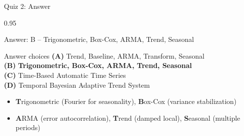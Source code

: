 \documentclass[9pt, aspectratio=169, t]{beamer}
\begin{document}
\begin{frame}{Quiz 2: Answer}
    \begin{cminipage}{0.95\textwidth}
    \begin{exampleblock}{Answer: B -- Trigonometric, Box-Cox, ARMA, Trend, Seasonal}

    \begin{block}{Answer choices}
        \textcolor{MainBlue}{\textbf{(A)}} Trend, Baseline, ARMA, Transform, Seasonal \incorrect\\[3pt]
        \textcolor{MainBlue}{\textbf{(B)}} \textbf{\textcolor{Forest}{Trigonometric, Box-Cox, ARMA, Trend, Seasonal}} \correct\\[3pt]
        \textcolor{MainBlue}{\textbf{(C)}} Time-Based Automatic Time Series \incorrect\\[3pt]
        \textcolor{MainBlue}{\textbf{(D)}} Temporal Bayesian Adaptive Trend System \incorrect
    \end{block}

        \vspace{0.3cm}

        \begin{itemize}
            \item \textbf{T}rigonometric (Fourier for seasonality), \textbf{B}ox-Cox (variance stabilization)
            \item \textbf{A}RMA (error autocorrelation), \textbf{T}rend (damped local), \textbf{S}easonal (multiple periods)
        \end{itemize}
    \end{exampleblock}

    \end{cminipage}
\end{frame}
\end{document}
